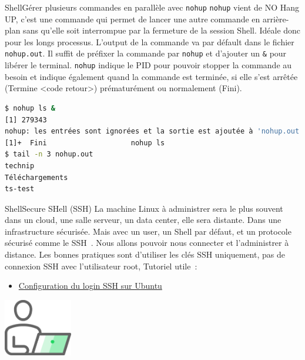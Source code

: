 \documentclass{beamer}
\begin{document}
    \begin{frame}[fragile]{Shell}{Gérer plusieurs commandes en parallèle avec \lstinline{nohup}}
        \lstinline{nohup} vient de NO Hang UP, c'est une commande qui permet de lancer une autre commande en arrière-plan sans qu'elle soit interrompue par la fermeture de la session Shell.
        Idéale donc pour les longs processus.
        L'output de la commande va par défault dans le fichier \lstinline{nohup.out}.
        \bigbreak
        Il suffit de préfixer la commande par \lstinline{nohup} et d'ajouter un \lstinline{&} pour libérer le terminal.
        \lstinline{nohup} indique le PID pour pouvoir stopper la commande au besoin et indique également quand la commande est terminée, si elle s'est arrêtée (Termine <code retour>) prématurément ou normalement (Fini).
        \begin{lstlisting}[language=bash]
$ nohup ls &
[1] 279343
nohup: les entrées sont ignorées et la sortie est ajoutée à 'nohup.out'
[1]+  Fini                    nohup ls
$ tail -n 3 nohup.out
technip
Téléchargements
ts-test
        \end{lstlisting}
    \end{frame}

    \begin{frame}{Shell}{Secure SHell (SSH)}
        La machine Linux à administrer sera le plus souvent dans un cloud, une salle serveur, un data center, elle sera distante.
        Dans une infrastructure sécurisée.
        \bigbreak
        Mais avec un user, un Shell par défaut, et un protocole sécurisé comme le SSH~.
        Nous allons pouvoir nous connecter et l'administrer à distance.
        \bigbreak
        Les bonnes pratiques sont d'utiliser les clés SSH uniquement, pas de connexion SSH avec l'utilisateur root,
        Tutoriel utile~:
        \begin{itemize}
            \item \href{https://phoenixnap.com/kb/generate-setup-ssh-key-ubuntu}{Configuration du login SSH sur Ubuntu}
        \end{itemize}
        \bigbreak
        \centering
        \includegraphics[width=3cm]{image/guy-in-front-of-desktop}
    \end{frame}
\end{document}
